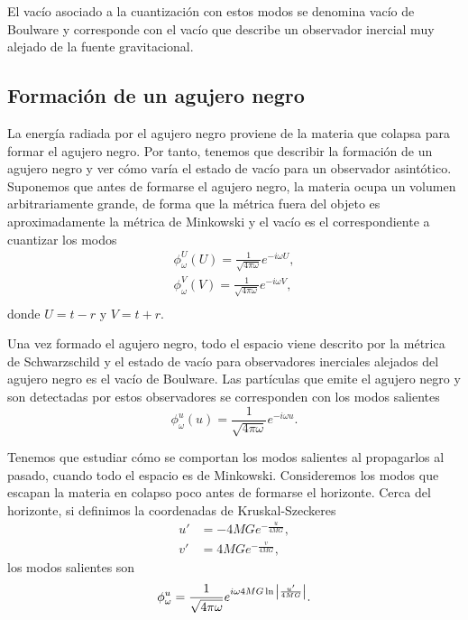 El vacío asociado a la cuantización con estos modos se denomina vacío de Boulware y 
corresponde con el vacío que describe un observador inercial muy alejado de la fuente
gravitacional.

\subsection{Formación de un agujero negro}

La energía radiada por el agujero negro proviene de la materia que colapsa para formar el agujero negro.
Por tanto, tenemos que describir la formación de un agujero negro y ver cómo varía el estado de vacío
para un observador asintótico.
Suponemos que antes de formarse el agujero negro, la materia ocupa un volumen arbitrariamente grande,
de forma que la métrica fuera del objeto es aproximadamente la métrica de Minkowski y el vacío es el correspondiente
a cuantizar los modos
\begin{equation}
  \begin{gathered}
    \phi_\omega^U (U)=\frac{1}{\sqrt{4\pi\omega}} e^{-i\omega U},\\
    \phi_\omega^V (V)=\frac{1}{\sqrt{4\pi\omega}} e^{-i\omega V},\\
  \end{gathered}
\end{equation}
donde $U=t-r$ y $V=t+r$.

Una vez formado el agujero negro, todo el espacio viene descrito por la métrica de Schwarzschild y
el estado de vacío para observadores inerciales alejados del agujero negro es el vacío de Boulware.
Las partículas que emite el agujero negro y son detectadas por estos observadores se corresponden con los
modos salientes
\begin{equation}
  \phi^u_\omega(u) = \frac{1}{\sqrt{4\pi \omega}}e^{-i\omega u}.
\end{equation}

Tenemos que estudiar cómo se comportan los modos salientes al propagarlos al pasado, cuando todo
el espacio es de Minkowski.
Consideremos los modos que escapan la materia en colapso poco antes de formarse el horizonte.
Cerca del horizonte, si definimos la coordenadas de Kruskal-Szeckeres
\begin{equation}
  \begin{aligned}
    u'&=-4MGe^{-\frac{u}{4MG}},\\
    v'&=4MGe^{-\frac{v}{4MG}},
  \end{aligned}
\end{equation}
los modos salientes son
\begin{equation}
  \phi^{u}_\omega = \frac{1}{\sqrt{4\pi\omega}}e^{i\omega 4MG\ln \abs{\frac{u'}{4MG}}}.
\end{equation}

